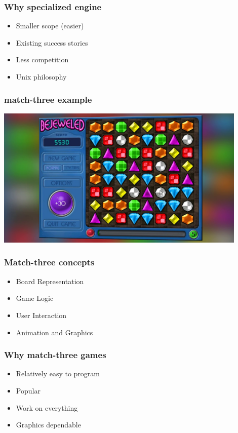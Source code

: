 \documentclass{beamer}
\begin{document}
        \begin{frame}
            \frametitle{Why specialized engine}
            \begin{itemize}
                \item Smaller scope (easier)
                \item Existing success stories 
                \item Less competition
                \item Unix philosophy
            \end{itemize}
            \end{frame}
    

    \begin{frame}
        \frametitle{match-three example}
        \includegraphics[width=0.9\textwidth]{bejewield}
        \end{frame}

        \begin{frame}
            \frametitle{Match-three concepts}
            \begin{itemize}
                \item Board Representation
                \item Game Logic 
                \item User Interaction
                \item Animation and Graphics
            \end{itemize}
            \end{frame}
        
        \begin{frame}
            \frametitle{Why match-three games}
            \begin{itemize}
                \item Relatively easy to program
                \item Popular 
                \item Work on everything
                \item Graphics dependable
            \end{itemize}
            \end{frame}
\end{document}
